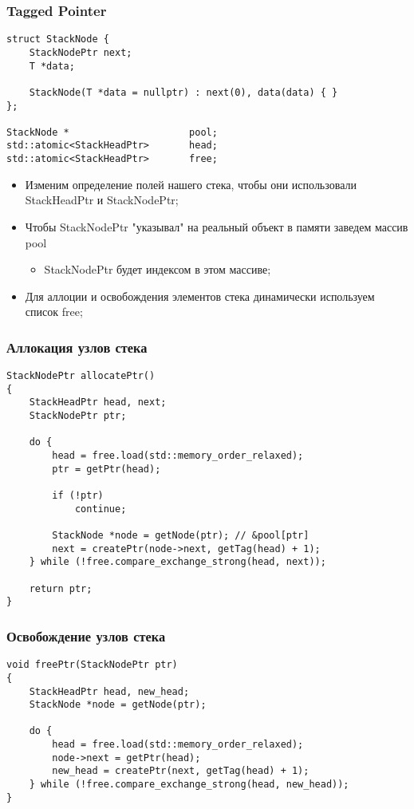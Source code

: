 \begin{frame}[fragile]
\frametitle{Tagged Pointer}

\begin{lstlisting}
struct StackNode {
    StackNodePtr next;
    T *data;

    StackNode(T *data = nullptr) : next(0), data(data) { }
};

StackNode *                     pool;
std::atomic<StackHeadPtr>       head;
std::atomic<StackHeadPtr>       free;
\end{lstlisting}

\begin{itemize}
  \item Изменим определение полей нашего стека, чтобы они использовали StackHeadPtr и StackNodePtr;
  \item Чтобы StackNodePtr "указывал" на реальный объект в памяти заведем массив pool
    \begin{itemize}
      \item StackNodePtr будет индексом в этом массиве;
    \end{itemize}
  \item Для аллоции и освобождения элементов стека динамически используем список free;
\end{itemize}
\end{frame}

\begin{frame}[fragile]
\frametitle{Аллокация узлов стека}
\begin{lstlisting}
StackNodePtr allocatePtr()
{
    StackHeadPtr head, next;
    StackNodePtr ptr;

    do {
        head = free.load(std::memory_order_relaxed);
        ptr = getPtr(head);

        if (!ptr)
            continue;

        StackNode *node = getNode(ptr); // &pool[ptr]
        next = createPtr(node->next, getTag(head) + 1);
    } while (!free.compare_exchange_strong(head, next));

    return ptr;
}
\end{lstlisting}
\end{frame}

\begin{frame}[fragile]
\frametitle{Освобождение узлов стека}

\begin{lstlisting}
void freePtr(StackNodePtr ptr)
{
    StackHeadPtr head, new_head;
    StackNode *node = getNode(ptr);

    do {
        head = free.load(std::memory_order_relaxed);
        node->next = getPtr(head);
        new_head = createPtr(next, getTag(head) + 1);
    } while (!free.compare_exchange_strong(head, new_head));
}
\end{lstlisting}
\end{frame}

